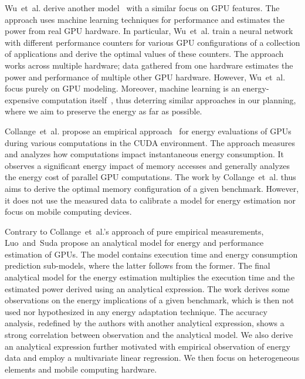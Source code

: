 Wu~et~al. derive another model~\citep{wu2015gpgpu} with a similar focus on GPU features. The approach uses machine learning techniques for performance and estimates the power from real GPU hardware. In particular, Wu~et~al. train a neural network with different performance counters for various GPU configurations of a collection of applications and derive the optimal values of these counters. The approach works across multiple hardware; data gathered from one hardware estimates the power and performance of multiple other GPU hardware. However, Wu~et~al. focus purely on GPU modeling. Moreover, machine learning is an energy-expensive computation itself~\citep{garcia2019estimation,yang2017method}, thus deterring similar approaches in our planning, where we aim to preserve the energy as far as possible.

Collange~et~al. propose an empirical approach~\citep{collange2009power} for energy evaluations of GPUs during various computations in the CUDA environment. The approach measures and analyzes how computations impact instantaneous energy consumption. It observes a significant energy impact of memory accesses and generally analyzes the energy cost of parallel GPU computations. The work by Collange~et~al. thus aims to derive the optimal memory configuration of a given benchmark. However, it does not use the measured data to calibrate a model for energy estimation nor focus on mobile computing devices.

Contrary to Collange~et~al.'s approach of pure empirical measurements, Luo~and~Suda\citep{luo2011performance} propose an analytical model for energy and performance estimation of GPUs. The model contains execution time and energy consumption prediction sub-models, where the latter follows from the former. The final analytical model for the energy estimation multiplies the execution time and the estimated power derived using an analytical expression. The work derives some observations on the energy implications of a given benchmark, which is then not used nor hypothesized in any energy adaptation technique. The accuracy analysis, redefined by the authors with another analytical expression, shows a strong correlation between observation and the analytical model. We also derive an analytical expression further motivated with empirical observation of energy data and employ a multivariate linear regression. We then focus on heterogeneous elements and mobile computing hardware.

